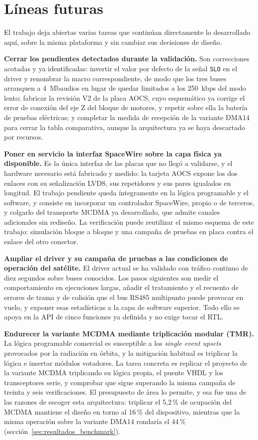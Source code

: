 \section{Líneas futuras}

El trabajo deja abiertas varias tareas que continúan directamente lo desarrollado aquí, sobre la
misma plataforma y sin cambiar sus decisiones de diseño.

\textbf{Cerrar los pendientes detectados durante la validación.} Son correcciones acotadas y ya
identificadas: invertir el valor por defecto de la señal \texttt{SLO} en el driver y renombrar la
macro correspondiente, de modo que los tres buses arranquen a 4~Mbaudios en lugar de quedar limitados
a los 250~kbps del modo lento; fabricar la revisión V2 de la placa AOCS, cuyo esquemático ya
corrige el error de conexión del eje Z del bloque de motores, y repetir sobre ella la batería de
pruebas eléctricas; y completar la medida de recepción de la variante DMA14 para cerrar la tabla
comparativa, aunque la arquitectura ya se haya descartado por recursos.

\textbf{Poner en servicio la interfaz SpaceWire sobre la capa física ya disponible.} Es la única
interfaz de las placas que no llegó a validarse, y el hardware necesario está fabricado y medido:
la tarjeta AOCS expone los dos enlaces con su señalización LVDS, sus repetidores y sus pares
igualados en longitud. El trabajo pendiente queda íntegramente en la lógica programable y el
software, y consiste en incorporar un controlador SpaceWire, propio o de terceros, y colgarlo del
transporte MCDMA ya desarrollado, que admite canales adicionales sin rediseño. La verificación
puede reutilizar el mismo esquema de este trabajo: simulación bloque a bloque y una campaña de
pruebas en placa contra el enlace del otro conector.

\textbf{Ampliar el driver y su campaña de pruebas a las condiciones de operación del satélite.}
El driver actual se ha validado con tráfico continuo de diez segundos sobre buses conocidos. Los
pasos siguientes son medir el comportamiento en ejecuciones largas, añadir el tratamiento y el
recuento de errores de trama y de colisión que el bus RS485 multipunto puede provocar en vuelo, y
exponer esas estadísticas a la capa de software superior. Todo ello se apoya en la API de cinco
funciones ya definida y no exige tocar el RTL.

\textbf{Endurecer la variante MCDMA mediante triplicación modular (TMR).} La lógica programable
comercial es susceptible a los \textit{single event upsets} provocados por la radiación en órbita,
y la mitigación habitual es triplicar la lógica e insertar módulos votadores. La tarea concreta es
replicar el proyecto de la variante MCDMA triplicando su lógica propia, el puente VHDL y los
transceptores serie, y comprobar que sigue superando la misma campaña de treinta y seis
verificaciones. El presupuesto de área lo permite, y esa fue una de las razones de escoger esta
arquitectura: triplicar el 5,2\,\% de ocupación del MCDMA mantiene el diseño en torno al 16\,\% del
dispositivo, mientras que la misma operación sobre la variante DMA14 rondaría el 44\,\%
(sección~\ref{sec:resultados_benchmark}).

